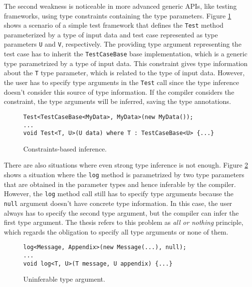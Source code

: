 \par
{}
The second weakness is noticeable in more advanced generic APIs, like testing frameworks, using type constraints containing the type parameters. 
Figure \ref{img28:usecase2} shows a scenario of a simple test framework that defines the \texttt{Test} method parameterized by a type of input data and test case represented as type parameters \texttt{U} and \texttt{V}, respectively. 
The providing type argument representing the test case has to inherit the \texttt{TestCaseBase} base implementation, which is a generic type parametrized by a type of input data. 
This constraint gives type information about the \texttt{T} type parameter, which is related to the type of input data. 
However, the user has to specify type arguments in the \texttt{Test} call since the type inference doesn’t consider this source of type information. 
If the compiler considers the constraint, the type arguments will be inferred, saving the type annotations.
\begin{figure}[h]
\begin{lstlisting}[style=csharp]
Test<TestCaseBase<MyData>, MyData>(new MyData());
...
void Test<T, U>(U data) where T : TestCaseBase<U> {...}
\end{lstlisting}
\caption{Constraints-based inference.}
\label{img28:usecase2}
\end{figure}
\par
{}
There are also situations where even strong type inference is not enough.
Figure \ref{img29:usecase3} shows a situation where the \texttt{log} method is parametrized by two type parameters that are obtained in the parameter types and hence inferable by the compiler. 
However, the \texttt{log} method call still has to specify type arguments because the \texttt{null} argument doesn’t have concrete type information. 
In this case, the user always has to specify the second type argument, but the compiler can infer the first type argument. 
The thesis refers to this problem as \textit{all or nothing} principle, which regards the obligation to specify all type arguments or none of them.
\begin{figure}[h]
\begin{lstlisting}[style=csharp]
log<Message, Appendix>(new Message(...), null);
...
void log<T, U>(T message, U appendix) {...}
\end{lstlisting}
\caption{Uninferable type argument.}
\label{img29:usecase3}
\end{figure}
